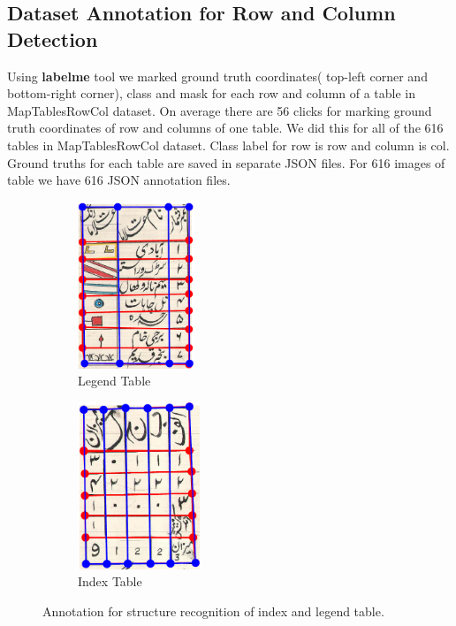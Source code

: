 \subsection{Dataset Annotation for Row and Column Detection}
\label{sec:dataset_rowCol}
Using \textbf{labelme} tool we marked ground truth coordinates( top-left corner and bottom-right corner), class and mask for each row and column of a table in MapTablesRowCol dataset. On average there are 56 clicks for marking ground truth coordinates of row and columns of one table. We did this for all of the 616 tables in MapTablesRowCol dataset. Class label for row is row and column is col. Ground truths for each table are saved in separate JSON files. For 616 images of table we have 616 JSON annotation files.
\begin{figure}[h!]
\centering
\begin{subfigure}{0.47\linewidth}
  \centering
  \includegraphics[width=\linewidth,height=5cm,keepaspectratio]{annot_legend_row_col.png}
    \caption{Legend Table}
    \label{Annotation for legend table}
\end{subfigure}
\begin{subfigure}{0.47\linewidth}
  \centering
  \includegraphics[width=\linewidth,height=5cm,keepaspectratio]{annot_index_row_col.png}
    \caption{Index Table}
    \label{Annotation for index table}
\end{subfigure}
\caption{Annotation for structure recognition of index and legend table.}
\label{fig:annot_rowcol}
\end{figure}
